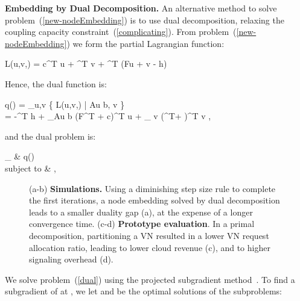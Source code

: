 \documentclass[a4paper, 10pt, conference]{ieeeconf}
\begin{document}
\vspace{1mm}
\noindent
{\bf Embedding by Dual Decomposition.}
An alternative method to solve problem~(\ref{new-nodeEmbedding}) is to use dual decomposition, relaxing the coupling capacity constraint~(\ref{complicating}). From problem~(\ref{new-nodeEmbedding}) we form the partial Lagrangian function:

\vspace{-5mm}
 
L(u,v,\lambda) = c^T u + ^T v + \lambda^T (Fu + v - h) 
\label{lagrangian}
 
\vspace{-2mm}
Hence, the dual function is:
 
q(\lambda) = \inf_{u,v} \{ L(u,v,\lambda) | Au \leq b,  v \leq {} \} \\
 = -\lambda^T h + \inf_{Au \leq b} (F^T \lambda + c)^T u + \inf_{ v \leq {}} (^T\lambda + )^T v \nonumber,
\label{dualFunction}
 
\vspace{-2mm}
and the dual problem is:
 
\max_{\lambda} & q(\lambda) \\
{\rm  subject \; \rm to} & \lambda {} \nonumber,
  


\begin{figure*}[t!]
\centering
{}
\vspace{-2mm}
\caption{(a-b) {\bf Simulations.} Using a diminishing step size rule  to complete the first  iterations, a node embedding solved by dual decomposition leads to a smaller duality gap (a), at the expense of a longer convergence time. (c-d) {\bf Prototype evaluation}. In a primal decomposition, partitioning a VN resulted in a lower VN request allocation ratio, leading to lower cloud revenue (c), and to higher signaling overhead (d). }
\label{figura}
\vspace{-6mm}
\end{figure*}


We solve problem~(\ref{dual})  using the projected subgradient method~\cite{boyd-book}.
To find a subgradient of  at ,  we let  and  be the optimal solutions of the subproblems:
 
\end{document}
